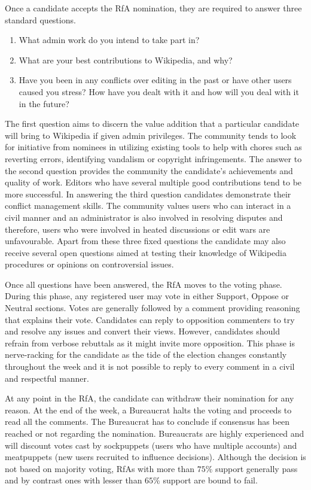 Once a candidate accepts the RfA nomination, they are required to answer three standard questions. 
\begin{enumerate}
    \item What admin work do you intend to take part in?
    \item What are your best contributions to Wikipedia, and why?
    \item Have you been in any conflicts over editing in the past or have other users caused you stress? How have you dealt with it and how will you deal with it in the future?
\end{enumerate}
The first question aims to discern the value addition that a particular candidate will bring to Wikipedia if given admin privileges. The community tends to look for initiative from nominees in utilizing existing tools to help with chores such as reverting errors, identifying vandalism or copyright infringements. The answer to the second question provides the community the candidate's achievements and quality of work. Editors who have several multiple good contributions tend to be more successful. In answering the third question candidates demonstrate their conflict management skills. The community values users who can interact in a civil manner and an administrator is also involved in resolving disputes and therefore, users who were involved in heated discussions or edit wars are unfavourable. Apart from these three fixed questions the candidate may also receive several open questions aimed at testing their knowledge of Wikipedia procedures or opinions on controversial issues.

Once all questions have been answered, the RfA moves to the voting phase. During this phase, any registered user may vote in either Support, Oppose or Neutral sections. Votes are generally followed by a comment providing reasoning that explains their vote. Candidates can reply to opposition commenters to try and resolve any issues and convert their views. However, candidates should refrain from verbose rebuttals as it might invite more opposition. This phase is nerve-racking for the candidate as the tide of the election changes constantly throughout the week and it is not possible to reply to every comment in a civil and respectful manner.

At any point in the RfA, the candidate can withdraw their nomination for any reason. At the end of the week, a Bureaucrat halts the voting and proceeds to read all the comments. The Bureaucrat has to conclude if consensus has been reached or not regarding the nomination. Bureaucrats are highly experienced and will discount votes cast by sockpuppets (users who have multiple accounts) and meatpuppets (new users recruited to influence decisions). Although the decision is not based on majority voting, RfAs with more than $75\%$ support generally pass and by contrast ones with lesser than $65\%$ support are bound to fail.  

